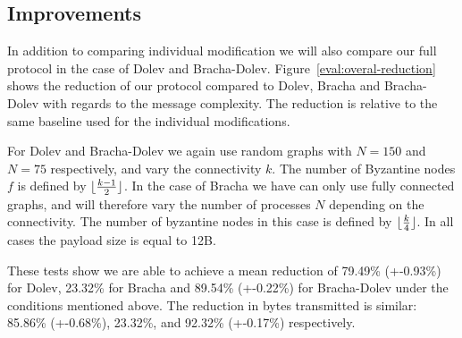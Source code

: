 
\subsection{Improvements}
In addition to comparing individual modification we will also compare our full protocol in the case of Dolev and Bracha-Dolev. Figure~\ref{eval:overal-reduction} shows the reduction of our protocol compared to Dolev, Bracha and Bracha-Dolev with regards to the message complexity. The reduction is relative to the same baseline used for the individual modifications.

For Dolev and Bracha-Dolev we again use random graphs with $N=150$ and $N=75$ respectively, and vary the connectivity $k$. The number of Byzantine nodes $f$ is defined by $\lfloor\frac{k-1}{2}\rfloor$. In the case of Bracha we have can only use fully connected graphs, and will therefore vary the number of processes $N$ depending on the connectivity. The number of byzantine nodes in this case is defined by $\lfloor\frac{k}{4}\rfloor$. In all cases the payload size is equal to 12B. 

These tests show we are able to achieve a mean reduction of 79.49\% (+-0.93\%) for Dolev, 23.32\% for Bracha and 89.54\% (+-0.22\%) for Bracha-Dolev under the conditions mentioned above. The reduction in bytes transmitted is similar: 85.86\% (+-0.68\%), 23.32\%, and 92.32\% (+-0.17\%) respectively. 

